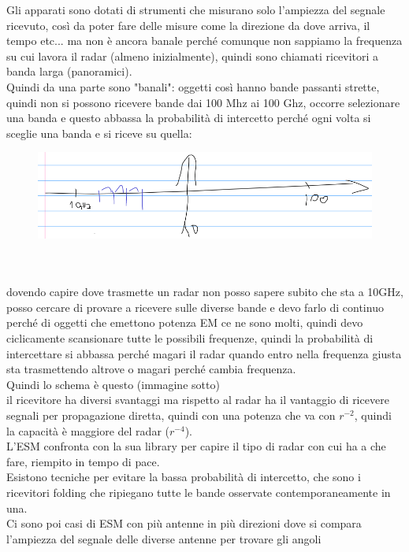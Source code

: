 \documentclass[oneside, 12pt]{extbook}
\begin{document}
Gli apparati sono dotati di strumenti che misurano solo l'ampiezza del segnale ricevuto, così da poter fare delle misure come la direzione da dove arriva, il tempo etc... ma non è ancora banale perché comunque non sappiamo la frequenza su cui lavora il radar (almeno inizialmente), quindi sono chiamati ricevitori a banda larga (panoramici).\\
Quindi da una parte sono "banali": oggetti così hanno bande passanti strette, quindi non si possono ricevere bande dai 100 Mhz ai 100 Ghz, occorre selezionare una banda e questo abbassa la probabilità di intercetto perché ogni volta si sceglie una banda e si riceve su quella:\\
\begin{figure}[!h]
	\includegraphics[scale=0.5]{immagini/localization/esm-freq.png}
\end{figure}\\\\
dovendo capire dove trasmette un radar non posso sapere subito che sta a 10GHz, posso cercare di provare a ricevere sulle diverse bande e devo farlo di continuo perché di oggetti che emettono potenza EM ce ne sono molti, quindi devo ciclicamente scansionare tutte le possibili frequenze, quindi la probabilità di intercettare si abbassa perché magari il radar quando entro nella frequenza giusta sta trasmettendo altrove o magari perché cambia frequenza.\\
Quindi lo schema è questo (immagine sotto)
\\il ricevitore ha diversi svantaggi ma rispetto al radar ha il vantaggio di ricevere segnali per propagazione diretta, quindi con una potenza che va con $r^{-2}$, quindi la capacità è maggiore del radar ($r^{-4}$).\\
L'ESM confronta con la sua library per capire il tipo di radar con cui ha a che fare, riempito in tempo di pace.\\
Esistono tecniche per evitare la bassa probabilità di intercetto, che sono i ricevitori folding che ripiegano tutte le bande osservate contemporaneamente in una.\\
Ci sono poi casi di ESM con più antenne in più direzioni dove si compara l'ampiezza del segnale delle diverse antenne per trovare gli angoli\\
\end{document}

